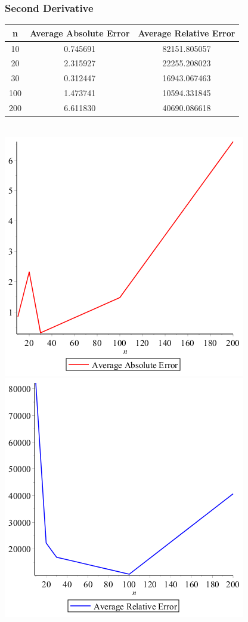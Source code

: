 \documentclass[11pt,fleqn]{article} %
\begin{document}
\subsubsection*{Second Derivative}
\begin{tabular}{c | c | c }
n & Average Absolute Error & Average Relative Error \\
\hline
10 & 0.745691 & 82151.805057 \\
20 & 2.315927& 22255.208023\\
30 & 0.312447& 16943.067463\\
100 & 1.473741 & 10594.331845 \\
200 & 6.611830 & 40690.086618 \\
\end{tabular}\\
\includegraphics[scale=.5]{plots/problem2secondderivplot1.png}
\includegraphics[scale=.5]{plots/problem2secondderivplot2.png}
\end{document}
